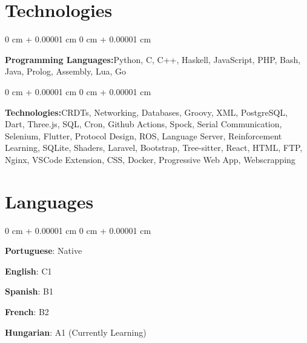\documentclass[10pt, letterpaper]{article}
\newenvironment{onecolentry}{
        \begin{adjustwidth}{
            0 cm + 0.00001 cm
        }{
            0 cm + 0.00001 cm
        }
    }{
        \end{adjustwidth}
    } %
\begin{document}
\section{Technologies}
        \begin{onecolentry}
            \textbf{Programming Languages:}Python, C, C++, Haskell, JavaScript, PHP, Bash, Java, Prolog, Assembly, Lua, Go\end{onecolentry}\vspace{0.2 cm}
        \begin{onecolentry}
            \textbf{Technologies:}CRDTs, Networking, Databases, Groovy, XML, PostgreSQL, Dart, Three.js, SQL, Cron, Github Actions, Spock, Serial Communication, Selenium, Flutter, Protocol Design, ROS, Language Server, Reinforcement Learning, SQLite, Shaders, Laravel, Bootstrap, Tree-sitter, React, HTML, FTP, Nginx, VSCode Extension, CSS, Docker, Progressive Web App, Webscrapping\end{onecolentry}\section{Languages}
        \begin{onecolentry}\item \textbf{Portuguese}: Native
\item \textbf{English}: C1
\item \textbf{Spanish}: B1
\item \textbf{French}: B2
\item \textbf{Hungarian}: A1 (Currently Learning)
\end{onecolentry}
\end{document}
